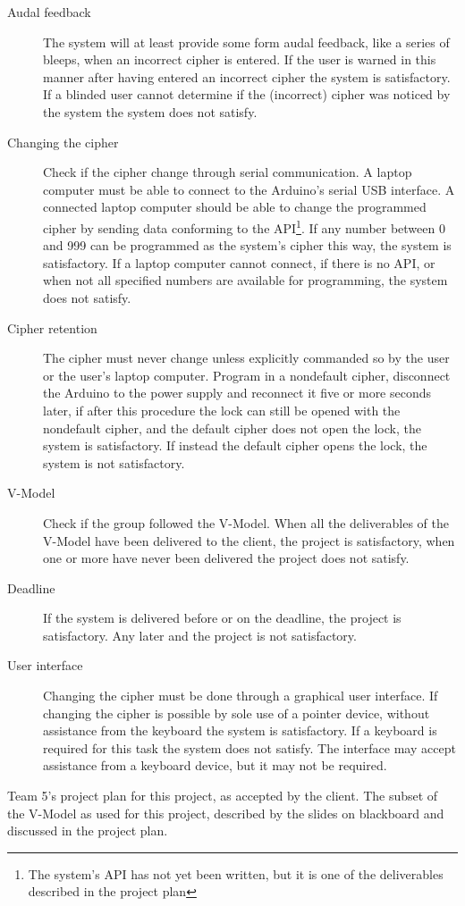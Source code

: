 \documentclass[oneside,a4paper,11pt,titlepage,openany]{report}
\begin{document}
\begin{description}
\item[Audal feedback]The system will at least provide some form audal feedback, like a series of bleeps, when an incorrect cipher is entered. If the user is warned in this manner after having entered an incorrect cipher the system is satisfactory. If a blinded user cannot determine if the (incorrect) cipher was noticed by the system the system does not satisfy. 
\item[Changing the cipher]Check if the cipher change through serial communication. A laptop computer must be able to connect to the Arduino's serial USB interface. A connected laptop computer should be able to change the programmed cipher by sending data conforming to the API\footnote{The system's API has not yet been written, but it is one of the deliverables described in the project plan\cite{plan}}. If any number between 0 and 999 can be programmed as the system's cipher this way, the system is satisfactory. If a laptop computer cannot connect, if there is no API, or when not all specified numbers are available for programming, the system does not satisfy.
\item[Cipher retention]The cipher must never change unless explicitly commanded so by the user or the user's laptop computer. Program in a nondefault cipher, disconnect the Arduino to the power supply and reconnect it five or more seconds later, if after this procedure the lock can still be opened with the nondefault cipher, and the default cipher does not open the lock, the system is satisfactory. If instead the default cipher opens the lock, the system is not satisfactory.
\item[V-Model]Check if the group followed the V-Model\cite{vmodel}. When all the deliverables of the V-Model have been delivered to the client, the project is satisfactory, when one or more have never been delivered the project does not satisfy. 
\item[Deadline]If the system is delivered before or on the deadline\cite{plan}, the project is satisfactory. Any later and the project is not satisfactory.
\item[User interface]Changing the cipher must be done through a graphical user interface. If changing the cipher is possible by sole use of a pointer device, without assistance from the keyboard the system is satisfactory. If a keyboard is required for this task the system does not satisfy. The interface may accept assistance from a keyboard device, but it may not be required.
\end{description}

\begin{thebibliography}{99}
Team 5's project plan for this project, as accepted by the client.
The subset of the V-Model as used for this project, described by the slides on blackboard and discussed in the project plan\cite{plan}.
\end{thebibliography}
\end{document}
